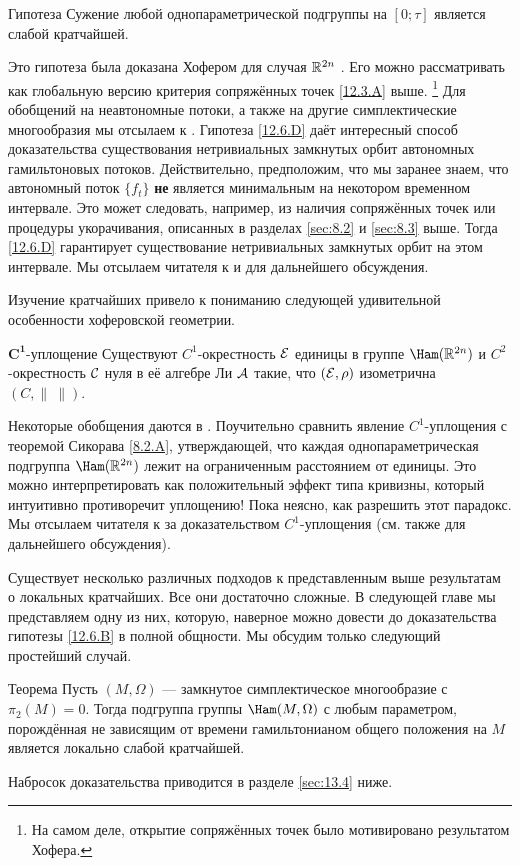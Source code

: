 \begin{thm}{Гипотеза}\label{12.6.D}
Сужение любой однопараметрической подгруппы на $[0;\tau]$ является слабой кратчайшей.
\end{thm}

Это гипотеза была доказана Хофером для случая $\mathbb{R}^{2n}$ \cite{H2}.
Его можно рассматривать как глобальную версию критерия сопряжённых точек \ref{12.3.A} выше.%
\footnote{На самом деле, открытие сопряжённых точек было мотивировано результатом Хофера.} 
Для обобщений на неавтономные потоки, а также на другие симплектические многообразия мы отсылаем к \cite{BP1, Si1,LM2,Sch3,MSl}.
Гипотеза \ref{12.6.D} даёт интересный способ доказательства существования нетривиальных замкнутых орбит автономных гамильтоновых потоков.
Действительно, предположим, что мы заранее знаем, что автономный поток $\{f_t\}$ \textbf{не} является минимальным на некотором временном интервале.
Это может следовать, например, из наличия сопряжённых точек или процедуры укорачивания, описанных в разделах \ref{sec:8.2} и \ref{sec:8.3} выше.
Тогда \ref{12.6.D} гарантирует существование нетривиальных замкнутых орбит на этом интервале.
Мы отсылаем читателя к \cite{LM2} и \cite{P8} для дальнейшего обсуждения.

Изучение кратчайших привело к пониманию следующей удивительной особенности хоферовской геометрии.

\begin{thm}[\cite{BP1}.]{$\bm{C^1}$-уплощение}
\label{12.6.E}
Существуют $C^1$-окрестность $\mathcal{E}$ единицы в группе $\Ham(\RR^{2n})$ и $C^2$-окрестность $\mathcal{C}$ нуля в её алгебре Ли $\mathcal{A}$ такие, что $(\mathcal{E}, \rho)$ изометрична $(C, \|\ \|)$.
\end{thm}

Некоторые обобщения даются в \cite{LM2}.
Поучительно сравнить явление $C^1$-уплощения с теоремой Сикорава \ref{8.2.A}, утверждающей, что каждая однопараметрическая подгруппа $\Ham(\RR^{2n})$ лежит на ограниченным расстоянием от единицы.
Это можно интерпретировать как положительный эффект типа кривизны, который интуитивно противоречит уплощению!
Пока неясно, как разрешить этот парадокс.
Мы отсылаем читателя к \cite{BP1,HZ} за доказательством $C^1$-уплощения (см. также \cite{P8} для дальнейшего обсуждения).

Существует несколько различных подходов к представленным выше результатам о локальных кратчайших.
Все они достаточно сложные.
В следующей главе мы представляем одну из них, которую, наверное можно довести до доказательства гипотезы \ref{12.6.B} в полной общности.
Мы обсудим только следующий простейший случай.

\begin{thm}{Теорема}\label{12.6.F}
Пусть $(M, \Omega)$ — замкнутое симплектическое многообразие с $\pi_2(M) = 0$.
Тогда подгруппа группы $\Ham(M, \Omega)$ с любым параметром, порождённая не зависящим от времени гамильтонианом общего положения на $M$ является локально слабой кратчайшей.
\end{thm}

Набросок доказательства приводится в разделе \ref{sec:13.4} ниже.
